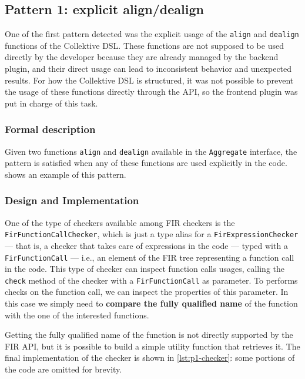 \documentclass[12pt,a4paper,openright,twoside]{book}
\begin{document}
\subsection{Pattern 1: explicit align/dealign}

One of the first pattern detected was the explicit usage of the
\lstinline{align} and \lstinline{dealign} functions of the Collektive DSL. These
functions are not supposed to be used directly by the developer because they are
already managed by the backend plugin, and their direct usage can lead to
inconsistent behavior and unexpected results. For how the Collektive DSL is
structured, it was not possible to prevent the usage of these functions directly
through the API, so the frontend plugin was put in charge of this task.

\subsubsection{Formal description}

Given two functions \lstinline{align} and \lstinline{dealign} available in the
\lstinline{Aggregate} interface, the pattern is satisfied when any of these
functions are used explicitly in the code.  shows an
example of this pattern.



\subsubsection{Design and Implementation}

One of the type of checkers available among \ac{FIR} checkers is the
\lstinline{FirFunctionCallChecker}, which is just a type alias for a
\lstinline{FirExpressionChecker} --- that is, a checker that takes care of
expressions in the code --- typed with a \lstinline{FirFunctionCall} --- i.e.,
an element of the \ac{FIR} tree representing a function call in the code. This
type of checker can inspect function calls usages, calling the \lstinline{check}
method of the checker with a \lstinline{FirFunctionCall} as parameter. 
%
To performs checks on the function call, we can inspect the properties of this
parameter. In this case we simply need to \textbf{compare the fully qualified
name} of the function with the one of the interested functions.

Getting the fully qualified name of the function is not directly supported by
the \ac{FIR} API, but it is possible to build a simple utility function that
retrieves it. The final implementation of the checker is shown in
\cref{lst:p1-checker}: some portions of the code are omitted for brevity.
\end{document}
